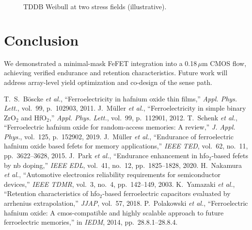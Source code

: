 \documentclass[journal]{IEEEtran}
\begin{document}
\begin{figure}[!t]
\centering
{}
\caption{TDDB Weibull at two stress fields (illustrative).}
\end{figure}

\FloatBarrier

\section{Conclusion}
We demonstrated a minimal-mask FeFET integration into a 0.18\,$\mu$m CMOS flow, achieving verified endurance and retention characteristics. Future work will address array-level yield optimization and co-design of the sense path.

\begin{thebibliography}{9}
 T.~S.~Böscke \emph{et al.}, ``Ferroelectricity in hafnium oxide thin films,'' \emph{Appl. Phys. Lett.}, vol.~99, p.~102903, 2011.
 J.~Müller \emph{et al.}, ``Ferroelectricity in simple binary ZrO$_2$ and HfO$_2$,'' \emph{Appl. Phys. Lett.}, vol.~99, p.~112901, 2012.
 T.~Schenk \emph{et al.}, ``Ferroelectric hafnium oxide for random-access memories: A review,'' \emph{J. Appl. Phys.}, vol.~125, p.~152902, 2019.
 J.~Müller \emph{et al.}, ``Endurance of ferroelectric hafnium oxide based fefets for memory applications,'' \emph{IEEE TED}, vol.~62, no.~11, pp.~3622--3628, 2015.
 J.~Park \emph{et al.}, ``Endurance enhancement in hfo$_2$-based fefets by nb doping,'' \emph{IEEE EDL}, vol.~41, no.~12, pp.~1825--1828, 2020.
 H.~Nakamura \emph{et al.}, ``Automotive electronics reliability requirements for semiconductor devices,'' \emph{IEEE TDMR}, vol.~3, no.~4, pp.~142--149, 2003.
 K.~Yamazaki \emph{et al.}, ``Retention characteristics of hfo$_2$-based ferroelectric capacitors evaluated by arrhenius extrapolation,'' \emph{JJAP}, vol.~57, 2018.
 P.~Polakowski \emph{et al.}, ``Ferroelectric hafnium oxide: A cmos-compatible and highly scalable approach to future ferroelectric memories,'' in \emph{IEDM}, 2014, pp.~28.8.1--28.8.4.
\end{thebibliography}
\end{document}
